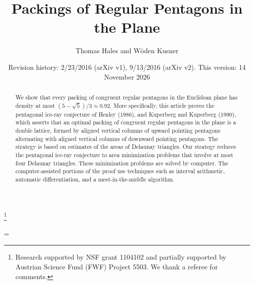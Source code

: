 \documentclass{amsart}
\numberwithin{equation}{section}
\numberwithin{figure}{section}
\numberwithin{table}{section}
\theoremstyle{plain}
\theoremstyle{definition}
\theoremstyle{remark}
\begin{document}
\title
    {Packings of Regular Pentagons in the Plane}
\author{Thomas Hales and W\"oden Kusner}
\date{Revision history: 2/23/2016 (arXiv v1), 9/13/2016 (arXiv v2). This version: 14 November 2026}
\thanks{Research supported by NSF grant 1104102 and partially supported by Austrian Science Fund (FWF) Project 5503. We thank a referee for comments.}

\begin{abstract}  
We show that every packing of congruent regular pentagons in the Euclidean plane has
density at most $(5-\sqrt5)/3\approx 0.92$.     More specifically,
this article proves the pentagonal ice-ray
conjecture of Henley (1986), and Kuperberg and Kuperberg (1990), 
which asserts that an optimal packing of congruent regular pentagons in the plane is a double lattice,
formed by aligned vertical columns of upward pointing pentagons alternating
with aligned vertical columns of downward pointing pentagons.  The strategy is based on estimates
of the areas of Delaunay triangles.  Our strategy reduces the pentagonal ice-ray conjecture to
area minimization problems that involve at most four Delaunay triangles.  These minimization problems
are solved by computer.  The computer-assisted portions of the proof use techniques such as
interval arithmetic, automatic differentiation, and a meet-in-the-middle algorithm.
\end{abstract}


\parskip=\baselineskip

 \maketitle



    


      
%
      
       
%
      
      
%





%
\end{document}
